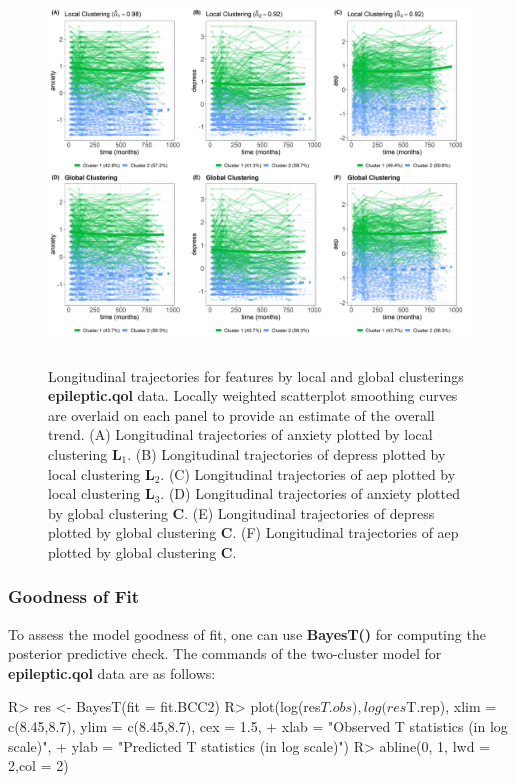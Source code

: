 \begin{figure}[h]
\centering
\includegraphics[width=\textwidth,height=10cm]{./Figures/trajplot.JPEG}
\caption{\label{fig:traj_epileptic_qol} Longitudinal trajectories for features by local and global clusterings \textbf{epileptic.qol} data. Locally weighted scatterplot smoothing curves are overlaid on each panel to provide an estimate of the overall trend. (A) Longitudinal trajectories of anxiety plotted by local clustering $\boldsymbol{L}_1$. (B) Longitudinal trajectories of depress plotted by local clustering $\boldsymbol{L}_2$. (C) Longitudinal trajectories of aep plotted by local clustering $\boldsymbol{L}_3$. (D) Longitudinal trajectories of anxiety plotted by global clustering $\boldsymbol{C}$. (E)  Longitudinal trajectories of depress plotted by global clustering $\boldsymbol{C}$. (F)  Longitudinal trajectories of aep plotted by global clustering $\boldsymbol{C}$.}
\end{figure}

\subsubsection{Goodness of Fit}

To assess the model goodness of fit, one can use \textbf{BayesT()} for computing the posterior predictive check. The commands of the two-cluster model for \textbf{epileptic.qol} data are as follows: 

\begin{example}
R> res <- BayesT(fit = fit.BCC2)
R> plot(log(res$T.obs), log(res$T.rep), xlim = c(8.45,8.7), ylim = c(8.45,8.7), cex = 1.5,
+        xlab = "Observed T statistics (in log scale)", 
+        ylab = "Predicted T statistics (in log scale)")
R> abline(0, 1, lwd = 2,col = 2)
\end{example} 

